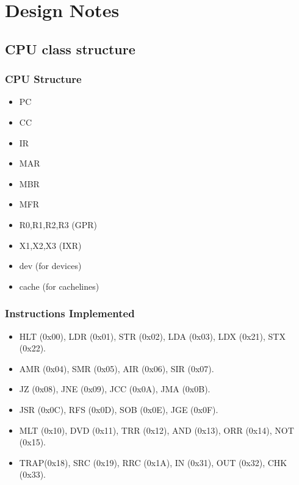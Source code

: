 \documentclass[10pt]{article}
\begin{document}
\section{Design Notes}
\subsection{CPU class structure}
\subsubsection{CPU Structure}
\begin{itemize}
  \item PC
  \item CC
  \item IR
  \item MAR
  \item MBR
  \item MFR
  \item R0,R1,R2,R3 (GPR)
  \item X1,X2,X3 (IXR)
  \item dev (for devices)
  \item cache (for cachelines)
\end{itemize}
\subsubsection{Instructions Implemented}
\begin{itemize}
  \item HLT (0x00), LDR (0x01), STR (0x02), LDA (0x03), LDX (0x21), STX (0x22).
  \item AMR (0x04), SMR (0x05), AIR (0x06), SIR (0x07).
  \item JZ  (0x08), JNE (0x09), JCC (0x0A), JMA (0x0B).
  \item JSR (0x0C), RFS (0x0D), SOB (0x0E), JGE (0x0F).
  \item MLT (0x10), DVD (0x11), TRR (0x12), AND (0x13), ORR (0x14), NOT (0x15).
  \item TRAP(0x18), SRC (0x19), RRC (0x1A), IN  (0x31), OUT (0x32), CHK (0x33).
\end{itemize}
\end{document}
